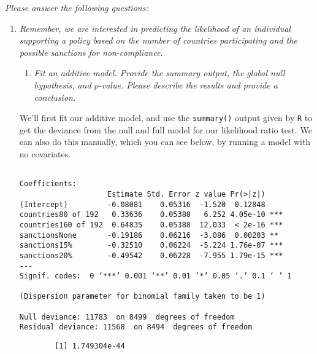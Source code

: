 \documentclass[12pt,letterpaper]{article}
\begin{document}
\newpage
\noindent \textit{Please answer the following questions:}

\begin{enumerate}
	\item
	\textit{Remember, we are interested in predicting the likelihood of an individual supporting a policy based on the number of countries participating and the possible sanctions for non-compliance.}
	\begin{enumerate}
		\item [] \textit{Fit an additive model. Provide the summary output, the global null hypothesis, and $p$-value. Please describe the results and provide a conclusion.}

	\end{enumerate}
	
		We’ll first fit our additive model, and use the \texttt{summary()} output given by \texttt{R} to get the deviance from the null and full model for our likelihood ratio test. We can also do this manually, which you can see below, by running a model with no covariates.
		
	 
	
	\begin{verbatim}

Coefficients:
                    Estimate Std. Error z value Pr(>|z|)    
(Intercept)         -0.08081    0.05316  -1.520  0.12848    
countries80 of 192   0.33636    0.05380   6.252 4.05e-10 ***
countries160 of 192  0.64835    0.05388  12.033  < 2e-16 ***
sanctionsNone       -0.19186    0.06216  -3.086  0.00203 ** 
sanctions15%        -0.32510    0.06224  -5.224 1.76e-07 ***
sanctions20%        -0.49542    0.06228  -7.955 1.79e-15 ***
---
Signif. codes:  0 ‘***’ 0.001 ‘**’ 0.01 ‘*’ 0.05 ‘.’ 0.1 ‘ ’ 1

(Dispersion parameter for binomial family taken to be 1)

Null deviance: 11783  on 8499  degrees of freedom
Residual deviance: 11568  on 8494  degrees of freedom\end{verbatim}
	
	 
	
	\begin{verbatim}
		[1] 1.749304e-44
	\end{verbatim}

	 
	

\end{enumerate}
\end{document}
